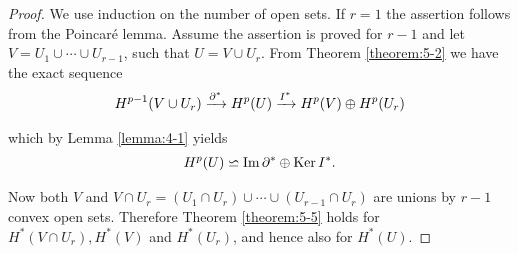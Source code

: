 \begin{proof}
  We use induction on the number of open sets. If $r = 1$ the assertion
follows from the Poincar\'e lemma. Assume the assertion is proved for $r - 1$ and
let $V = U_1\cup\cdots\cup U_{r-1}$, such that $U = V\cup U_r$. From Theorem \ref{theorem:5-2} we have 
the exact sequence
\begin{align*}
  H^{p-1}(V\cup U_r) \xrightarrow[]{\partial^*} H^p(U) \xrightarrow[]{I^*} H^p(V)\oplus H^p(U_r)
\end{align*}

which by Lemma \ref{lemma:4-1} yields
\begin{align*}
  H^p(U) \backsimeq \operatorname{Im}\partial^* \oplus \operatorname{Ker} I^*.
\end{align*}

Now both $V$ and $V\cap U_r = (U_1\cap U_r)\cup\cdots\cup (U_{r-1}\cap U_r)$ are unions by $r-1$ convex open sets.
Therefore Theorem \ref{theorem:5-5} holds for $H^*(V\cap U_r), H^*(V)$ and $H^*(U_r)$, and hence also for $H^*(U)$.
\end{proof}
